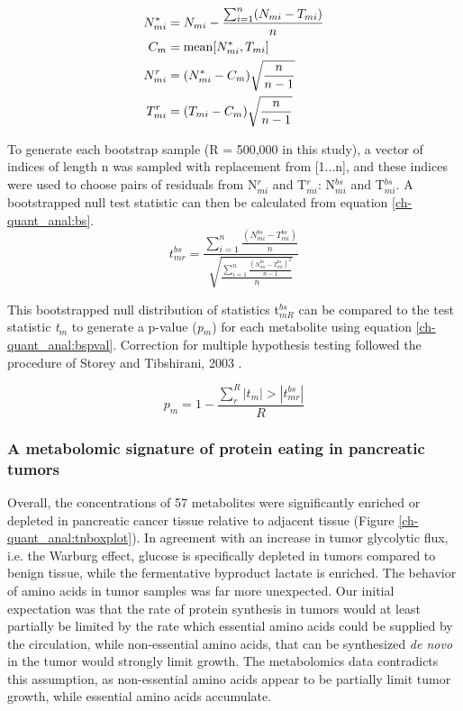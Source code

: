 \begin{subequations}
\begin{align}
N^{*}_{mi} &= N_{mi} - \frac{\sum_{i = 1}^{n}(N_{mi} - T_{mi})}{n}\label{ch-quant_anal:residvar-1}\\
C_{m} &= \text{mean}[N^{*}_{mi}, T_{mi}]\label{ch-quant_anal:residvar-2}\\
N^{r}_{mi} &= (N^{*}_{mi} - C_{m})\sqrt{\frac{n}{n - 1}}\notag\\
T^{r}_{mi} &= (T_{mi} - C_{m})\sqrt{\frac{n}{n - 1}}\label{ch-quant_anal:residvar-3}
\end{align}
\end{subequations}


To generate each bootstrap sample (R = 500,000 in this study), a vector of indices of length n was sampled with replacement from [1...n], and these indices were used to choose pairs of residuals from N$^{r}_{mi}$ and T$^{r}_{mi}$: N$^{bs}_{mi}$ and T$^{bs}_{mi}$.  A bootstrapped null test statistic can then be calculated from equation \ref{ch-quant_anal:bs}.
\begin{equation}
t^{bs}_{mr} = \frac{\sum_{i = 1}^{n}\frac{(N^{bs}_{mi} - T^{bs}_{mi})}{n}}{\sqrt{\frac{\sum_{i = 1}^{n}\frac{(N^{bs}_{mi} - T^{bs}_{mi})^{2}}{n-1}}{n}}}\label{ch-quant_anal:bs}
\end{equation}

This bootstrapped null distribution of statistics t$^{bs}_{mR}$ can be compared to the test statistic \textit{t}$_{m}$ to generate a p-value (\textit{p}$_{m}$) for each metabolite using equation \ref{ch-quant_anal:bspval}. Correction for multiple hypothesis testing followed the procedure of Storey and Tibshirani, 2003 \cite{Storey:2003cj}.

\begin{equation}
p_{m} = 1 - \frac{\sum_{r}^{R}|t_{m}| > |t_{mr}^{bs}|}{R}\label{ch-quant_anal:bspval}
\end{equation}

\subsubsection{A metabolomic signature of protein eating in pancreatic tumors}

Overall, the concentrations of 57 metabolites were significantly enriched or depleted in pancreatic cancer tissue relative to adjacent tissue (Figure \ref{ch-quant_anal:tnboxplot}).  In agreement with an increase in tumor glycolytic flux, i.e. the Warburg effect, glucose is specifically depleted in tumors compared to benign tissue, while the fermentative byproduct lactate is enriched.  The behavior of amino acids in tumor samples was far more unexpected.  Our initial expectation was that the rate of protein synthesis in tumors would at least partially be limited by the rate which essential amino acids could be supplied by the circulation, while non-essential amino acids, that can be synthesized \textit{de novo} in the tumor would strongly limit growth. The metabolomics data contradicts this assumption, as non-essential amino acids appear to be partially limit tumor growth, while essential amino acids accumulate. 

